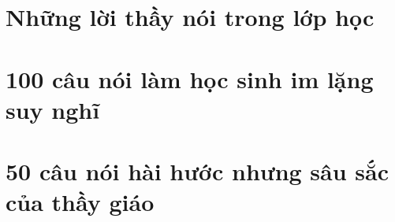 \documentclass[14pt,a4paper,twoside]{extbook}
\begin{document}

\frontmatter
\tableofcontents
\clearpage


\mainmatter

\part{Những lời thầy nói trong lớp học}






\part{100 câu nói làm học sinh im lặng suy nghĩ}











\part{50 câu nói hài hước nhưng sâu sắc của thầy giáo}






\backmatter

\end{document}
